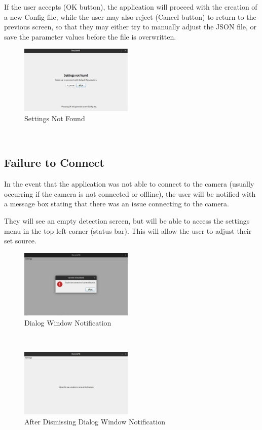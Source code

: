 \documentclass[conference]{IEEEtran}
\begin{document}
If the user accepts (OK button), the application will proceed with the creation of a new Config file, while the user may also reject (Cancel button) to return to the previous screen, so that they may either try to manually adjust the JSON file, or save the parameter values before the file is overwritten.

\begin{figure}[h]
    \centering
    \includegraphics[width=0.48\textwidth]{images/settings_alert.eps}
    \caption{Settings Not Found}
\end{figure}~\\

\newpage
\subsection{Failure to Connect}
In the event that the application was not able to connect to the camera (usually occurring if the camera is not connected or offline), the user will be notified with a message box stating that there was an issue connecting to the camera.

They will see an empty detection screen, but will be able to access the settings menu in the top left corner (status bar). This will allow the user to adjust their set source.~\\

\begin{figure}[h]
    \centering
    \includegraphics[width=0.48\textwidth]{images/camera_source_error.eps}
    \caption{Dialog Window Notification}
\end{figure}~\\
\begin{figure}[h]
    \centering
    \includegraphics[width=0.48\textwidth]{images/camera_source_error_2.eps}
    \caption{After Dismissing Dialog Window Notification}

\end{figure}~\\
\end{document}
